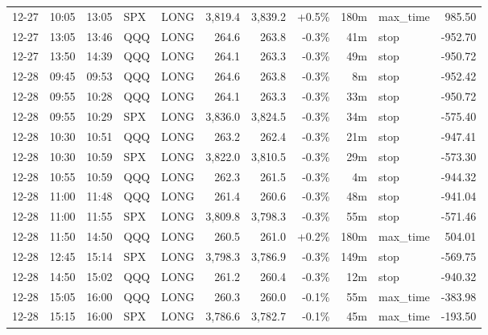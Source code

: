 \documentclass[11pt,a4paper,twoside]{article}
\begin{document}
\begin{center}
\begin{longtable}{>{\color{txtmain}}l l l l l r r r r >{\color{txtmain}}l r}
12-27 & 10:05 & 13:05 & SPX & LONG & 3,819.4 & 3,839.2 & \textcolor{wingreen}{+0.5\%} & 180m & max\_time & \textcolor{wingreen}{985.50} \\
12-27 & 13:05 & 13:46 & QQQ & LONG & 264.6 & 263.8 & \textcolor{lossred}{-0.3\%} & 41m & stop & \textcolor{lossred}{-952.70} \\
12-27 & 13:50 & 14:39 & QQQ & LONG & 264.1 & 263.3 & \textcolor{lossred}{-0.3\%} & 49m & stop & \textcolor{lossred}{-950.72} \\
12-28 & 09:45 & 09:53 & QQQ & LONG & 264.6 & 263.8 & \textcolor{lossred}{-0.3\%} & 8m & stop & \textcolor{lossred}{-952.42} \\
12-28 & 09:55 & 10:28 & QQQ & LONG & 264.1 & 263.3 & \textcolor{lossred}{-0.3\%} & 33m & stop & \textcolor{lossred}{-950.72} \\
12-28 & 09:55 & 10:29 & SPX & LONG & 3,836.0 & 3,824.5 & \textcolor{lossred}{-0.3\%} & 34m & stop & \textcolor{lossred}{-575.40} \\
12-28 & 10:30 & 10:51 & QQQ & LONG & 263.2 & 262.4 & \textcolor{lossred}{-0.3\%} & 21m & stop & \textcolor{lossred}{-947.41} \\
12-28 & 10:30 & 10:59 & SPX & LONG & 3,822.0 & 3,810.5 & \textcolor{lossred}{-0.3\%} & 29m & stop & \textcolor{lossred}{-573.30} \\
12-28 & 10:55 & 10:59 & QQQ & LONG & 262.3 & 261.5 & \textcolor{lossred}{-0.3\%} & 4m & stop & \textcolor{lossred}{-944.32} \\
12-28 & 11:00 & 11:48 & QQQ & LONG & 261.4 & 260.6 & \textcolor{lossred}{-0.3\%} & 48m & stop & \textcolor{lossred}{-941.04} \\
12-28 & 11:00 & 11:55 & SPX & LONG & 3,809.8 & 3,798.3 & \textcolor{lossred}{-0.3\%} & 55m & stop & \textcolor{lossred}{-571.46} \\
12-28 & 11:50 & 14:50 & QQQ & LONG & 260.5 & 261.0 & \textcolor{wingreen}{+0.2\%} & 180m & max\_time & \textcolor{wingreen}{504.01} \\
12-28 & 12:45 & 15:14 & SPX & LONG & 3,798.3 & 3,786.9 & \textcolor{lossred}{-0.3\%} & 149m & stop & \textcolor{lossred}{-569.75} \\
12-28 & 14:50 & 15:02 & QQQ & LONG & 261.2 & 260.4 & \textcolor{lossred}{-0.3\%} & 12m & stop & \textcolor{lossred}{-940.32} \\
12-28 & 15:05 & 16:00 & QQQ & LONG & 260.3 & 260.0 & \textcolor{lossred}{-0.1\%} & 55m & max\_time & \textcolor{lossred}{-383.98} \\
12-28 & 15:15 & 16:00 & SPX & LONG & 3,786.6 & 3,782.7 & \textcolor{lossred}{-0.1\%} & 45m & max\_time & \textcolor{lossred}{-193.50} \\

\end{longtable}
\end{center}
\end{document}
